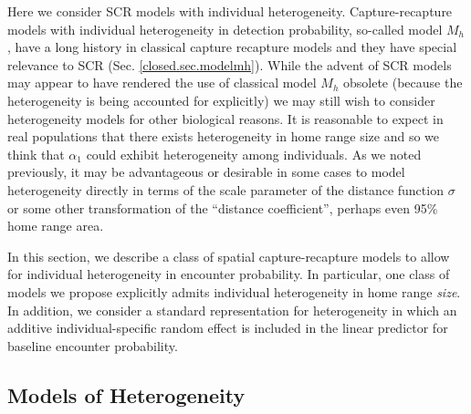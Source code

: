 Here we consider SCR models with individual heterogeneity.
Capture-recapture models with individual
heterogeneity in detection probability, so-called model $M_{h}$, have
a long history in classical capture recapture models and they have
special relevance to SCR (Sec. \ref{closed.sec.modelmh}). 
While the advent of SCR models may appear to have rendered the use of
classical model $M_h$ obsolete (because the heterogeneity is being
accounted for explicitly) we may still wish to consider
heterogeneity models for other biological reasons.
It is reasonable
to expect in real populations that there exists
heterogeneity in home range size and so we think that $\alpha_{1}$
could exhibit heterogeneity among individuals.  As we noted
previously, it may be advantageous or desirable in some cases to model
heterogeneity directly in terms of the scale parameter of the distance
function $\sigma$ or
some other transformation of the ``distance coefficient'', perhaps
even 95\% home range area.

In this section, we describe a class of spatial capture-recapture
models to allow for individual heterogeneity in encounter
probability.  In particular, one class of models we propose explicitly
admits individual heterogeneity in home range {\it size}. In addition,
we consider a standard representation for heterogeneity in which an
additive individual-specific random effect is included in the linear
predictor for baseline encounter probability.  

\subsection{Models of Heterogeneity}
\label{covariates.sec.heterogeneity}

